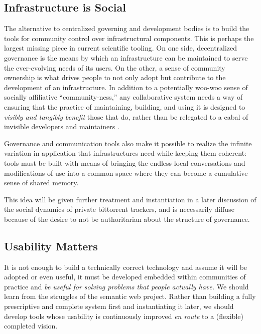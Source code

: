 \documentclass[10pt]{tufte-book}
\begin{document}
\subsection{Infrastructure is
Social}

The alternative to centralized governing and development bodies is to
build the tools for community control over infrastructural components.
This is perhaps the largest missing piece in current scientific tooling.
On one side, decentralized governance is the means by which an
infrastructure can be maintained to serve the ever-evolving needs of its
users. On the other, a sense of community ownership is what drives
people to not only adopt but contribute to the development of an
infrastructure. In addition to a potentially woo-woo sense of socially
affiliative ``community-ness,'' any collaborative system needs a way of
ensuring that the practice of maintaining, building, and using it is
designed to \emph{visibly and tangibly benefit} those that do, rather
than be relegated to a cabal of invisible developers and maintainers
\citep{grudinGroupwareSocialDynamics1994, randallDistributedOntologyBuilding2011} .

Governance and communication tools also make it possible to realize the
infinite variation in application that infrastructures need while
keeping them coherent: tools must be built with means of bringing the
endless local conversations and modifications of use into a common space
where they can become a cumulative sense of shared memory.

This idea will be given further treatment and instantiation in a later
discussion of the social dynamics of private bittorrent trackers, and is
necessarily diffuse because of the desire to not be authoritarian about
the structure of governance.


\subsection{Usability Matters}

It is not enough to build a technically correct technology and assume it
will be adopted or even useful, it must be developed embedded within
communities of practice and \emph{be useful for solving problems that
people actually have.} We should learn from the struggles of the
semantic web project. Rather than building a fully prescriptive and
complete system first and instantiating it later, we should develop
tools whose usability is continuously improved \emph{en route} to a
(flexible) completed vision.
\end{document}
